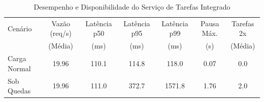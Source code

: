 \begin{table}[htbp]
\caption{Desempenho e Disponibilidade do Serviço de Tarefas Integrado}
\label{tab:integracao_servico}
\centering
\small
\begin{tabular}{@{}lcccccc@{}}
\toprule
Cenário & Vazão (req/s) & Latência p50 & Latência p95 & Latência p99 & Pausa Máx. & Tarefas 2x \\
 & (Média) & (ms) & (ms) & (ms) & (s) & (Média) \\
\midrule
Carga Normal & 19.96 & 110.1 & 114.8 & 118.0 & 0.07 & 0.0 \\
Sob Quedas & 19.96 & 111.0 & 372.7 & 1571.8 & 1.76 & 2.0 \\
\bottomrule
\end{tabular}
\end{table}
